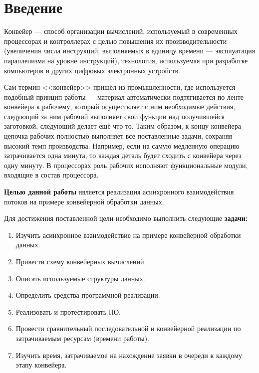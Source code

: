 \documentclass[12pt]{report}
\begin{document}
	
	\newpage
	\tableofcontents
    \chapter*{Введение}
    Конвейер\cite{conveyor} — способ организации вычислений, используемый в современных процессорах и контроллерах с целью повышения их производительности (увеличения числа инструкций, выполняемых в единицу времени — эксплуатация параллелизма на уровне инструкций), технология, используемая при разработке компьютеров и других цифровых электронных устройств.
    
    Сам термин <<конвейер>> пришёл из промышленности, где используется подобный принцип работы — материал автоматически подтягивается по ленте конвейера к рабочему, который осуществляет с ним необходимые действия, следующий за ним рабочий выполняет свои функции над получившейся заготовкой, следующий делает ещё что-то. Таким образом, к концу конвейера цепочка рабочих полностью выполняет все поставленные задачи, сохраняя высокий темп производства. Например, если на самую медленную операцию затрачивается одна минута, то каждая деталь будет сходить с конвейера через одну минуту. В процессорах роль рабочих исполняют функциональные модули, входящие в состав процессора.
    
    
    \textbf{Целью данной работы} является реализация асинхронного взаимодействия потоков на примере конвейерной обработки данных.
    
    Для достижения поставленной цели необходимо выполнить следующие \textbf{задачи:}
    \begin{enumerate}
    	\item Изучить асинхронное взаимодействие на примере конвейерной обработки данных.
    	\item Привести схему конвейерных вычислений.
    	\item Описать используемые структуры данных.
    	\item Определить средства программной реализации.
    	\item Реализовать и протестировать ПО.
    	\item Провести сравнительный последовательной и конвейерной реализации по затрачиваемым ресурсам (времени работы).
    	\item Изучить время, затрачиваемое на нахождение заявки в очереди к каждому этапу конвейера.
    \end{enumerate}
    \newpage
    
\end{document}
